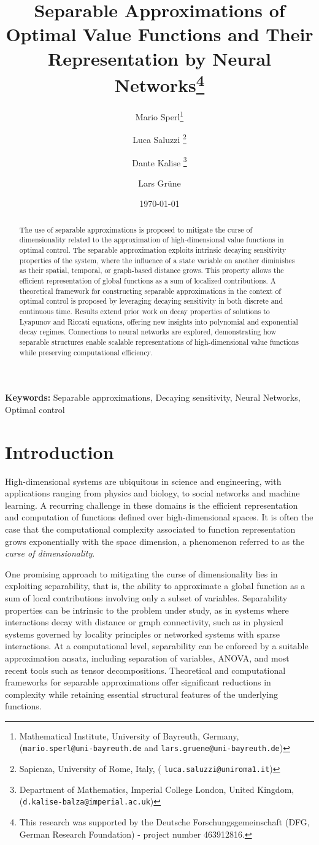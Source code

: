 \documentclass{article}
\title{Separable Approximations of Optimal Value Functions and Their Representation by Neural Networks\thanks{This research was supported by the Deutsche Forschungsgemeinschaft (DFG, German Research Foundation) - project number 463912816.}}
\author{
    Mario Sperl\thanks{Mathematical Institute, University of Bayreuth, Germany, (\texttt{mario.sperl@uni-bayreuth.de} and \texttt{lars.gruene@uni-bayreuth.de})} \and
    Luca Saluzzi \thanks{Sapienza, University of Rome, Italy, ( \texttt{luca.saluzzi@uniroma1.it})} \and
    Dante Kalise \thanks{Department of Mathematics, Imperial College London, United Kingdom, (\texttt{d.kalise-balza@imperial.ac.uk})} \and 
    Lars Grüne\footnotemark[2]
}
\date{\today}
\begin{document}
\maketitle

\begin{abstract}
The use of separable approximations is proposed to mitigate the curse of dimensionality related to the approximation of high-dimensional value functions in optimal control. The separable approximation exploits intrinsic decaying sensitivity properties of the system, where the influence of a state variable on another diminishes as their spatial, temporal, or graph-based distance grows. This property allows the efficient representation of global functions as a sum of localized contributions. A theoretical framework for constructing separable approximations in the context of optimal control is proposed by leveraging decaying sensitivity in both discrete and continuous time. Results extend prior work on decay properties of solutions to Lyapunov and Riccati equations, offering new insights into polynomial and exponential decay regimes. Connections to neural networks are explored, demonstrating how separable structures enable scalable representations of high-dimensional value functions while preserving computational efficiency.
\end{abstract}

\noindent\textbf{Keywords:} Separable approximations, Decaying sensitivity, Neural Networks, Optimal control




\section{Introduction}

High-dimensional systems are ubiquitous in science and engineering, with applications ranging from physics and biology, to social networks and machine learning. A recurring challenge in these domains is the efficient representation and computation of functions defined over high-dimensional spaces. It is often the case that the computational complexity associated to function representation grows exponentially with the space dimension, a phenomenon referred to as the {\sl curse of dimensionality}. 

One promising approach to mitigating the curse of dimensionality lies in exploiting separability, that is, the ability to approximate a global function as a sum of local contributions involving only a subset of variables. Separability properties can be intrinsic to the problem under study, as in systems where interactions decay with distance or graph connectivity, such as in physical systems governed by locality principles or networked systems with sparse interactions. At a computational level, separability can be enforced by a suitable approximation ansatz, including separation of variables, ANOVA\cite{OW03}, and most recent tools such as tensor decompositions\cite{BM02,OS11}. Theoretical and computational frameworks for separable  approximations offer significant reductions in complexity while retaining essential structural features of the underlying functions.
\end{document}
